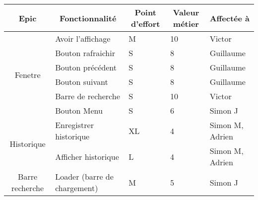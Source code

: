 \documentclass[10pt,a4paper]{article}
\begin{document}
\begin{table}[h]
\begin{tabular}{|c|l|l|l|l|}
\hline
\textbf{Epic}               & \multicolumn{1}{c|}{\textbf{Fonctionnalité}} & \multicolumn{1}{c|}{\textbf{Point d'effort}} & \multicolumn{1}{c|}{\textbf{Valeur métier}} & \textbf{Affectée à} \\ \hline
\multirow{6}{*}{Fenetre}    & Avoir l'affichage                            & M                                            & 10                                          & Victor              \\ \cline{2-5} 
                            & Bouton rafraichir                            & S                                            & 8                                           & Guillaume           \\ \cline{2-5} 
                            & Bouton précédent                             & S                                            & 8                                           & Guillaume           \\ \cline{2-5} 
                            & Bouton suivant                               & S                                            & 8                                           & Guillaume           \\ \cline{2-5} 
                            & Barre de recherche                           & S                                            & 10                                          & Victor              \\ \cline{2-5} 
                            & Bouton Menu                                  & S                                            & 6                                           & Simon J             \\ \hline
\multirow{2}{*}{Historique} & Enregistrer historique                       & XL                                           & 4                                           & Simon M, Adrien     \\ \cline{2-5} 
                            & Afficher historique                          & L                                            & 4                                           & Simon M, Adrien     \\ \hline
Barre recherche             & Loader (barre de chargement)                 & M                                            & 5                                           & Simon J             \\ \hline
\end{tabular}
\end{table}
\end{document}
